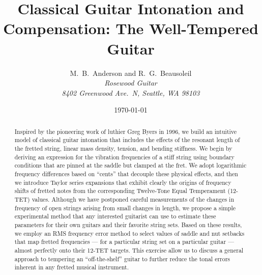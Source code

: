 \documentclass[12pt]{article}
\title{{\Huge\textbf{Classical Guitar Intonation and Compensation: The Well-Tempered Guitar}}}
\author{ M.\ B.\ Anderson and R.\ G.\ Beausoleil \\
 \textit{Rosewood Guitar} \\
 \textit{8402 Greenwood Ave.\ N, Seattle, WA  98103}}
\date{\today}
\begin{document}
 \maketitle

 \begin{abstract}
Inspired by the pioneering work of luthier Greg Byers in 1996, we build an intuitive model of classical guitar intonation that includes the effects of the resonant length of the fretted string, linear mass density, tension, and bending stiffness. We begin by deriving an expression for the vibration frequencies of a stiff string using boundary conditions that are pinned at the saddle but clamped at the fret. We adopt logarithmic frequency differences based on ``cents'' that decouple these physical effects, and then we introduce Taylor series expansions that exhibit clearly the origins of frequency shifts of fretted notes from the corresponding Twelve-Tone Equal Temperament (12-TET) values. Although we have postponed careful measurements of the changes in frequency of open strings arising from small changes in length, we propose a simple experimental method that any interested guitarist can use to estimate these parameters for their own guitars and their favorite string sets. Based on these results, we employ an RMS frequency error method to select values of saddle and nut setbacks that map fretted frequencies --- for a particular string set on a particular guitar --- almost perfectly onto their 12-TET targets. This exercise allow us to discuss a general approach to tempering an ``off-the-shelf'' guitar to further reduce the tonal errors inherent in any fretted musical instrument.
 \end{abstract}

 \tableofcontents

 
 
 
 
 
 

 \appendix
 
 
 
 


 
 

 
\end{document}
